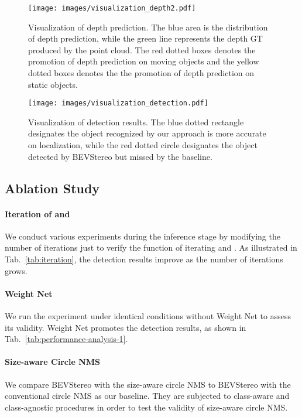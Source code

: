 \documentclass[letterpaper]{article} \usepackage[]{aaai23}  \usepackage{times}  \usepackage{helvet}  \usepackage{courier}  \usepackage[hyphens]{url}  \usepackage{graphicx} \urlstyle{rm} \def\UrlFont{\rm}  \usepackage{natbib}  \usepackage{caption} \frenchspacing  \setlength{\pdfpagewidth}{8.5in} \setlength{\pdfpageheight}{11in} \usepackage{algorithm}
\begin{document}
\begin{figure*}[h!]
\texttt{[image: images/visualization\_depth2.pdf]}
\centering
\caption{Visualization of depth prediction. The blue area is the distribution of depth prediction, while the green line represents the depth GT produced by the point cloud. The red dotted boxes denotes the promotion of depth prediction on moving objects and the yellow dotted boxes denotes the the promotion of depth prediction on static objects.}
\label{fig:visualize_depth}
\end{figure*}






\begin{figure*}[t!]
\texttt{[image: images/visualization\_detection.pdf]}
\centering
\caption{Visualization of detection results. The blue dotted rectangle designates the object recognized by our approach is more accurate on localization, while the red dotted circle designates the object detected by BEVStereo but missed by the baseline.}
\label{fig:visualize_detection}
\end{figure*}



\subsection{Ablation Study}
\paragraph{Iteration of  and }
We conduct various experiments during the inference stage by modifying the number of iterations just to verify the function of iterating  and . As illustrated in Tab.~\ref{tab:iteration}, the detection results improve as the number of iterations grows.
\paragraph{Weight Net}
We run the experiment under identical conditions without Weight Net to assess its validity. Weight Net promotes the detection results, as shown in Tab.~\ref{tab:performance-analysis-1}. 

\paragraph{Size-aware Circle NMS}
We compare BEVStereo with the size-aware circle NMS to BEVStereo with the conventional circle NMS as our baseline. They are subjected to class-aware and class-agnostic procedures in order to test the validity of size-aware circle NMS.
\end{document}
